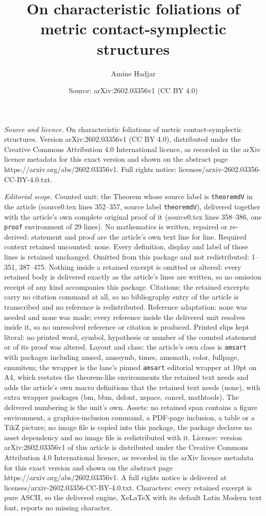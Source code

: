 \documentclass[10pt,a4paper]{amsart}
\title[On characteristic foliations of metric contact-symplectic st]{On characteristic foliations of metric contact-symplectic structures}
\author{Amine Hadjar}
\date{Source: arXiv:2602.03356v1 (CC BY 4.0)}
\begin{document}
\maketitle

\noindent\emph{Source and licence.} On characteristic foliations of metric contact-symplectic structures. Version arXiv:2602.03356v1 (CC BY 4.0), distributed under the Creative Commons Attribution 4.0 International licence, as recorded in the arXiv licence metadata for this exact version and shown on the abstract page https://arxiv.org/abs/2602.03356v1. Full rights notice: licenses/arxiv-2602.03356-CC-BY-4.0.txt.\par\smallskip

\noindent\textit{Editorial scope.} Counted unit: the Theorem whose source label is \texttt{theoremdV} in the article (source0.tex lines 352--357, source label \texttt{theoremdV}), delivered together with the article's own complete original proof of it (source0.tex lines 358--386, one \texttt{proof} environment of 29 lines). No mathematics is written, repaired or re-derived: statement and proof are the article's own text line for line. Required context retained uncounted: none. Every definition, display and label of those lines is retained unchanged. Omitted from this package and not redistributed: 1--351, 387--475. Nothing inside a retained excerpt is omitted or altered: every retained body is delivered exactly as the article's lines are written, so no omission receipt of any kind accompanies this package. Citations: the retained excerpts carry no citation command at all, so no bibliography entry of the article is transcribed and no reference is redistributed. Reference adaptation: none was needed and none was made; every reference inside the delivered unit resolves inside it, so no unresolved reference or citation is produced. Printed slips kept literal: no printed word, symbol, hypothesis or number of the counted statement or of its proof was altered. Layout and class: the article's own class is \texttt{amsart} with packages including amscd, amssymb, times, amsmath, color, fullpage, enumitem; the wrapper is the lane's pinned \texttt{amsart} editorial wrapper at 10pt on A4, which restates the theorem-like environments the retained text needs and adds the article's own macro definitions that the retained text needs (none), with extra wrapper packages (bm, bbm, dsfont, xspace, cancel, mathtools). The delivered numbering is the unit's own. Assets: no retained span contains a figure environment, a graphics-inclusion command, a PDF-page inclusion, a table or a TikZ picture; no image file is copied into this package, the package declares no asset dependency and no image file is redistributed with it. Licence: version arXiv:2602.03356v1 of this article is distributed under the Creative Commons Attribution 4.0 International licence, as recorded in the arXiv licence metadata for this exact version and shown on the abstract page https://arxiv.org/abs/2602.03356v1. A full rights notice is delivered at licenses/arxiv-2602.03356-CC-BY-4.0.txt. Characters: every retained excerpt is pure ASCII, so the delivered engine, XeLaTeX with its default Latin Modern text font, reports no missing character.
\end{document}
